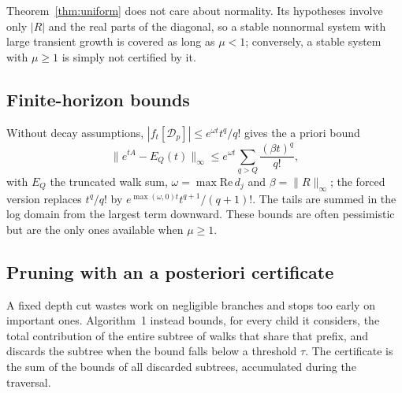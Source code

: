 \documentclass[aps,pra,superscriptaddress,floatfix,longbibliography,twocolumn]{revtex4-2}
\begin{document}
Theorem~\ref{thm:uniform} does not care about normality. Its hypotheses involve only $|R|$ and the real parts of the diagonal, so a stable nonnormal system with large transient growth is covered as long as $\mu<1$; conversely, a stable system with $\mu\ge1$ is simply not certified by it.

\subsection{Finite-horizon bounds}
Without decay assumptions, $|f_t[\mathcal{D}_p]|\le e^{\omega t}t^q/q!$ gives the a priori bound
\begin{equation}\label{eq:horizon}
\|e^{tA}-E_Q(t)\|_\infty\le e^{\omega t}\sum_{q>Q}\frac{(\beta t)^q}{q!},
\end{equation}
with $E_Q$ the truncated walk sum, $\omega=\max\mathrm{Re}\,d_j$ and $\beta=\|R\|_\infty$; the forced version replaces $t^q/q!$ by $e^{\max(\omega,0)t}t^{q+1}/(q+1)!$. The tails are summed in the log domain from the largest term downward. These bounds are often pessimistic but are the only ones available when $\mu\ge1$.

\subsection{Pruning with an a posteriori certificate}\label{sec:certificate}
A fixed depth cut wastes work on negligible branches and stops too early on important ones. Algorithm~1 instead bounds, for every child it considers, the total contribution of the entire subtree of walks that share that prefix, and discards the subtree when the bound falls below a threshold $\tau$. The certificate is the sum of the bounds of all discarded subtrees, accumulated during the traversal.
\end{document}

